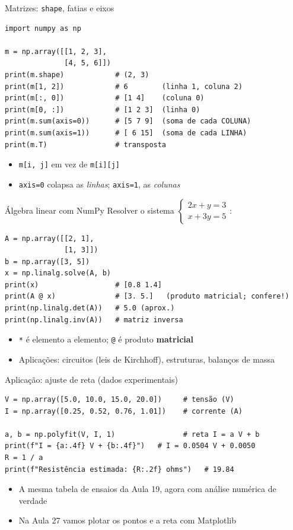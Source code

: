 \documentclass[aspectratio=169,10pt,t]{beamer}
\begin{document}
\begin{frame}[fragile]{Matrizes: \texttt{shape}, fatias e eixos}
\begin{lstlisting}
import numpy as np
	
m = np.array([[1, 2, 3],
              [4, 5, 6]])
print(m.shape)            # (2, 3)
print(m[1, 2])            # 6        (linha 1, coluna 2)
print(m[:, 0])            # [1 4]    (coluna 0)
print(m[0, :])            # [1 2 3]  (linha 0)
print(m.sum(axis=0))      # [5 7 9]  (soma de cada COLUNA)
print(m.sum(axis=1))      # [ 6 15]  (soma de cada LINHA)
print(m.T)                # transposta
\end{lstlisting}
  \begin{itemize}
    \item \texttt{m[i, j]} em vez de \texttt{m[i][j]}
    \item \texttt{axis=0} colapsa as \emph{linhas}; \texttt{axis=1}, as \emph{colunas}
  \end{itemize}
\end{frame}

\begin{frame}[fragile]{Álgebra linear com NumPy}
  Resolver o sistema \(\begin{cases}2x + y = 3\\ x + 3y = 5\end{cases}\):
\begin{lstlisting}
A = np.array([[2, 1],
              [1, 3]])
b = np.array([3, 5])
x = np.linalg.solve(A, b)
print(x)                  # [0.8 1.4]
print(A @ x)              # [3. 5.]   (produto matricial; confere!)
print(np.linalg.det(A))   # 5.0 (aprox.)
print(np.linalg.inv(A))   # matriz inversa
\end{lstlisting}
  \begin{itemize}
    \item \texttt{*} é elemento a elemento; \texttt{@} é produto \textbf{matricial}
    \item Aplicações: circuitos (leis de Kirchhoff), estruturas, balanços de massa
  \end{itemize}
\end{frame}

\begin{frame}[fragile]{Aplicação: ajuste de reta (dados experimentais)}
\begin{lstlisting}
V = np.array([5.0, 10.0, 15.0, 20.0])     # tensão (V)
I = np.array([0.25, 0.52, 0.76, 1.01])    # corrente (A)

a, b = np.polyfit(V, I, 1)                # reta I = a V + b
print(f"I = {a:.4f} V + {b:.4f}")   # I = 0.0504 V + 0.0050
R = 1 / a
print(f"Resistência estimada: {R:.2f} ohms")   # 19.84
\end{lstlisting}
  \begin{itemize}
    \item A mesma tabela de ensaios da Aula 19, agora com análise numérica de verdade
    \item Na Aula 27 vamos \alert{plotar} os pontos e a reta com Matplotlib
  \end{itemize}
\end{frame}
\end{document}
